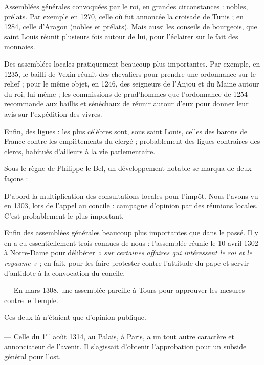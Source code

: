 \documentclass[french,twoside]{book} %
\newcommand{\labelchar}[1]{{\color{rubric}\bf #1}}
\begin{document}
\begin{listalpha}[itemsep=0pt,]
\item Assemblées générales convoquées par le roi, en grandes circonstances : nobles, prélats. Par exemple en 1270, celle où fut annoncée la croisade de Tunis ; en 1284, celle d’Aragon (nobles et prélats). Mais aussi les conseils de bourgeois, que saint Louis réunit plusieurs fois autour de lui, pour l’éclairer sur le fait des monnaies.
\item Des assemblées locales pratiquement beaucoup plus importantes. Par exemple, en 1235, le bailli de Vexin réunit des chevaliers pour prendre une ordonnance sur le relief ; pour le même objet, en 1246, des seigneurs de l’Anjou et du Maine autour du roi, lui-même ; les commissions de prud’hommes que l’ordonnance de 1254 recommande aux baillis et sénéchaux de réunir autour d’eux pour donner leur avis sur l’expédition des vivres.
\item Enfin, des ligues : les plus célèbres sont, sous saint Louis, celles des barons de France contre les empiètements du clergé ; probablement des ligues contraires des clercs, habitués d’ailleurs à la vie parlementaire.

\end{listalpha}\bigbreak
\noindent \labelchar{3)} Sous le règne de Philippe le Bel, un développement notable se marqua de deux façons :\par
D’abord la multiplication des consultations locales pour l’impôt. Nous l’avons vu en 1303, lors de l’appel au concile : campagne d’opinion par des réunions locales. C’est probablement le plus important.\par
Enfin des assemblées générales beaucoup plus importantes que dans le passé. Il y en a eu essentiellement trois connues de nous :  
\label{p46} l’assemblée réunie le 10 avril 1302 à Notre-Dame pour délibérer \emph{« sur certaines affaires qui intéressent le roi et le royaume »} ; en fait, pour les faire protester contre l’attitude du pape et servir d’antidote à la convocation du concile.\par
— En mars 1308, une assemblée pareille à Tours pour approuver les mesures contre le Temple.\par
Ces deux-là n’étaient que d’opinion publique.\par
— Celle du 1\textsuperscript{er} août 1314, au Palais, à Paris, a un tout autre caractère et annonciateur de l’avenir. Il s’agissait d’obtenir l’approbation pour un subside général pour l’ost.\par
\end{document}
